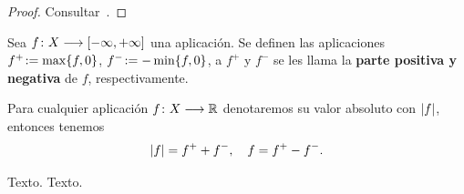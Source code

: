 \begin{proof} Consultar~\cite[p. 227]{Hewit}. \end{proof}

\begin{defn}\label{dfcp5}Sea $f\colon X\longrightarrow [-\infty,+\infty]$ una aplicación. Se definen
las aplicaciones $f^+\!:=\max\{f,0\}$, $f^-\!:=-\min\{f,0\}$, a
$f^+$ y $f^-$ se les llama la \textbf{parte positiva y negativa} de
$f$, respectivamente.
\end{defn}


\begin{prp}\label{prcp2}Para cualquier aplicación $f\colon X\longrightarrow \mathbb{R}$
denotaremos su valor absoluto con $\left\vert f\right\vert$, entonces tenemos
\[\left\vert f\right\vert=f^++f^-,\quad f=f^+-f^-.\]
\end{prp}

Texto. Texto.

